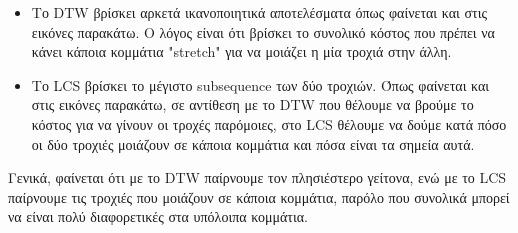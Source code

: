 \documentclass[a4paper,10pt]{article}
\begin{document}
        \begin{itemize}
            \item Το DTW βρίσκει αρκετά ικανοποιητικά αποτελέσματα όπως φαίνεται και στις εικόνες παρακάτω.
            Ο λόγος είναι ότι βρίσκει το συνολικό κόστος που πρέπει να κάνει κάποια κομμάτια "stretch" για να μοιάζει
            η μία τροχιά στην άλλη.
            \item Το LCS βρίσκει το μέγιστο subsequence των δύο τροχιών. Όπως φαίνεται και στις εικόνες παρακάτω, σε αντίθεση
            με το DTW που θέλουμε να βρούμε το κόστος για να γίνουν οι τροχές παρόμοιες, στο LCS θέλουμε να δούμε κατά πόσο οι δύο 
            τροχιές μοιάζουν σε κάποια κομμάτια και πόσα είναι τα σημεία αυτά.
        \end{itemize}

        Γενικά, φαίνεται ότι με το DTW παίρνουμε τον πλησιέστερο γείτονα, ενώ με το LCS παίρνουμε τις τροχιές που μοιάζουν
        σε κάποια κομμάτια, παρόλο που συνολικά μπορεί να είναι πολύ διαφορετικές στα υπόλοιπα κομμάτια.
        
        \newpage
\end{document}
